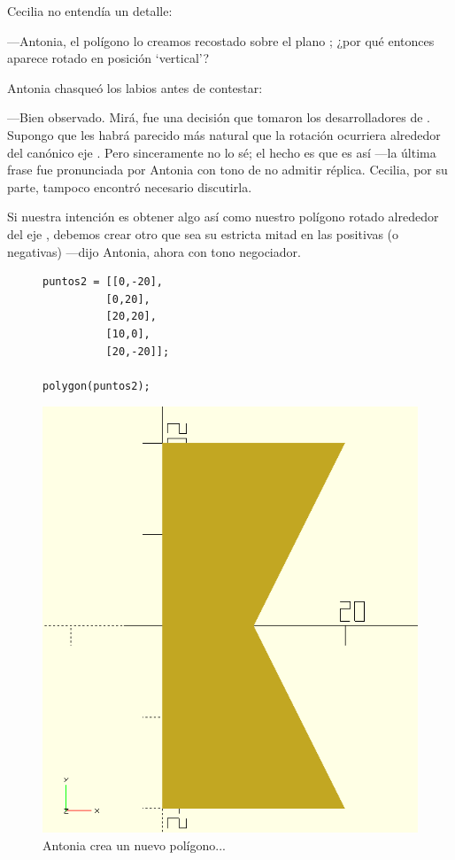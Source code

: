   Cecilia no entendía un detalle:

  ---Antonia, el polígono lo creamos recostado sobre el plano
  ; ¿por qué entonces aparece rotado en posición `vertical'?

  Antonia chasqueó los labios antes de contestar:

  ---Bien observado. Mirá, fue una decisión que tomaron los
  desarrolladores de \openscad{}. Supongo que les habrá parecido más
  natural que la rotación ocurriera alrededor del canónico eje
  . Pero sinceramente no lo sé; el hecho es que es así ---la
  última frase fue pronunciada por Antonia con tono de no admitir
  réplica. Cecilia, por su parte, tampoco encontró necesario
  discutirla.

  \guillemotright Si nuestra intención es obtener algo así como
  nuestro polígono rotado alrededor del eje , debemos crear
  otro que sea su estricta mitad en las  positivas (o
  negativas) ---dijo Antonia, ahora con tono negociador.

  
  \begin{figure}[ht]
  \begin{minipage}[]{.5\textwidth}%
    \begin{lstlisting}
puntos2 = [[0,-20],
          [0,20],
          [20,20],
          [10,0],
          [20,-20]];
          
polygon(puntos2);
    \end{lstlisting}
  \end{minipage}\hfill
  \begin{minipage}[]{.5\textwidth}%
    \flushright
      \includegraphics[width=.5\textwidth]{imagenes/poligono-2}
    \end{minipage}
    \caption{Antonia crea un nuevo polígono...}
    \label{fig:poligono-2}
  \end{figure}



